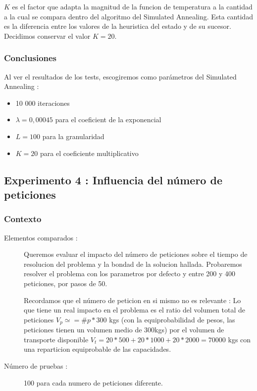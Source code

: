 \documentclass{article}
\begin{document}
$K$ es el factor que adapta la magnitud de la funcion de temperatura a la
cantidad a la cual se compara dentro del algoritmo del Simulated Annealing. Esta
cantidad es la diferencia entre los valores de la heuristica del estado y de su
sucesor. Decidimos conservar el valor $K=20$.

\subsubsection{Conclusiones}

Al ver el resultados de los tests, escogiremos como parámetros del Simulated
Annealing :
\begin{itemize}
\item 10 000 iteraciones
\item $\lambda = 0,00045$ para el coeficient de la exponencial
\item $L=100$ para la granularidad
\item $K=20$ para el coeficiente multiplicativo
\end{itemize}

\subsection{Experimento 4 : Influencia del número de peticiones}

\subsubsection{Contexto}
\begin{description}
\item[Elementos comparados :] Queremos evaluar el impacto del número de
peticiones sobre el tiempo de resolucion del problema y la bondad de la solucion
hallada. Probaremos resolver el problema con los parametros por defecto y entre
200 y 400 peticiones, por pasos de 50.

Recordamos que el número de peticion en si mismo no es relevante : Lo que tiene
un real impacto en el problema es el ratio del volumen total de peticiones
$V_p\simeq = \#p * 300$ kgs (con la equiprobabilidad de pesos, las peticiones
tienen un volumen medio de 300kgs) por el volumen de transporte disponible
$V_t = 20*500+20*1000+20*2000 = 70 000$ kgs con una reparticion equiprobable de
las capacidades.

\item[Número de pruebas :] 100 para cada numero de peticiones diferente.
\end{description}
\end{document}
